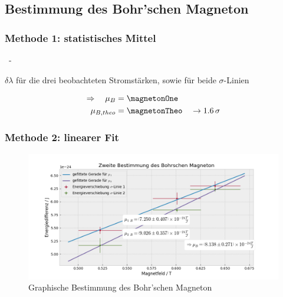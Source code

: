   \subsection{Bestimmung des Bohr'schen Magneton}
  \subsubsection{Methode 1: statistisches Mittel}
      \begin{myframe}{\subsecname\ - \\\subsubsecname}
         \begin{table}[H]                                                             
             \centering                                                               
                                                               
             \caption{$\delta\lambda$ für die drei beobachteten Stromstärken, sowie für beide $\sigma$-Linien}                                                 
         \end{table}
         \begin{align}
             \Rightarrow \quad \mu_B &= \magnetonOne\\
             \mu_{B, theo} &= \magnetonTheo \quad \rightarrow \SI{1.6}{\sigma}
         \end{align}
      \end{myframe}      
  \subsubsection{Methode 2: linearer Fit}
        \begin{myframe}{\subsubsecname}
            \begin{figure}
                \centering
                \includegraphics[width=.85\paperwidth]{img/mu_B2}
                \caption{Graphische Bestimmung des Bohr’schen Magneton} 
            \end{figure}            
        \end{myframe}
